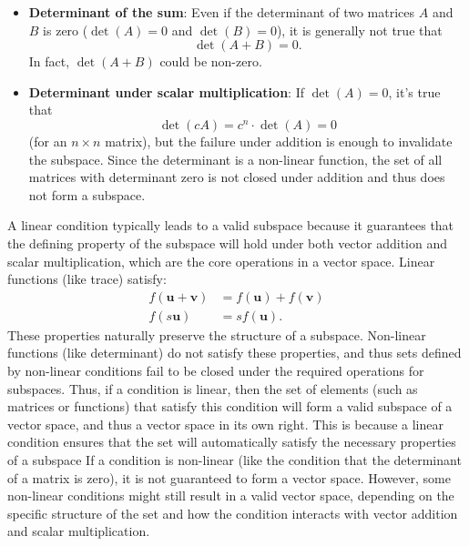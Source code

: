 \documentclass{report}
\begin{document}
\begin{itemize}
\begin{itemize}
                 \item \textbf{Determinant of the sum}: Even if the determinant of two matrices \( A \) and \( B \) is zero 
                 (\( \det(A) = 0 \) and \( \det(B) = 0 \)), it is generally not true that 
                 \[
                     \det(A + B) = 0.
                 \]
                 In fact, \( \det(A + B) \) could be non-zero.
                 \bigbreak \noindent 
             \item \textbf{Determinant under scalar multiplication}: If \( \det(A) = 0 \), it’s true that 
                 \[
                     \det(cA) = c^n \cdot \det(A) = 0
                 \]
                 (for an \( n \times n \) matrix), but the failure under addition is enough to invalidate the subspace.
                 \bigbreak \noindent 
                 Since the determinant is a non-linear function, the set of all matrices with determinant zero is not closed under addition and thus does not form a subspace.
             \end{itemize}
             \bigbreak \noindent 
             A linear condition typically leads to a valid subspace because it guarantees that the defining property of the subspace will hold under both vector addition and scalar multiplication, which are the core operations in a vector space.
             \bigbreak \noindent 
             Linear functions (like trace) satisfy:
             \begin{align*}
                 f(\mathbf{u} + \mathbf{v}) &= f(\mathbf{u}) + f(\mathbf{v}) \\
                                            f(s\mathbf{u})&= sf(\mathbf{u})
             .\end{align*}
             These properties naturally preserve the structure of a subspace.
             \bigbreak \noindent 
             Non-linear functions (like determinant) do not satisfy these properties, and thus sets defined by non-linear conditions fail to be closed under the required operations for subspaces.
             \bigbreak \noindent 
             Thus, if a condition is linear, then the set of elements (such as matrices or functions) that satisfy this condition will form a valid subspace of a vector space, and thus a vector space in its own right. This is because a linear condition ensures that the set will automatically satisfy the necessary properties of a subspace
             \bigbreak \noindent 
            If a condition is non-linear (like the condition that the determinant of a matrix is zero), it is not guaranteed to form a vector space. However, some non-linear conditions might still result in a valid vector space, depending on the specific structure of the set and how the condition interacts with vector addition and scalar multiplication.

\end{itemize}
\end{document}

